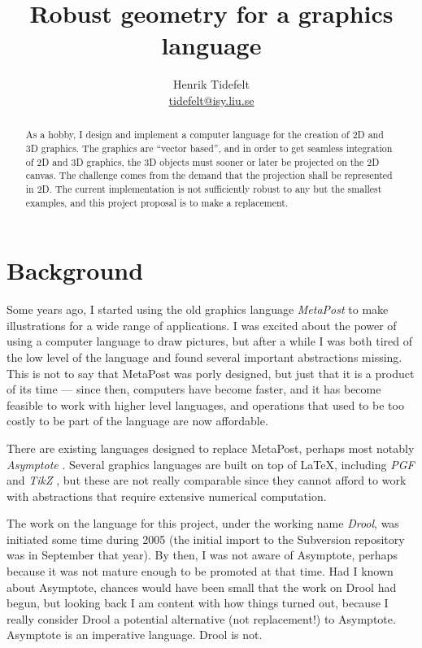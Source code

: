 \documentclass[a4paper]{article}
\title{Robust geometry for a graphics language}
\author{Henrik Tidefelt\\
\href{mailto:tidefelt@isy.liu.se}{\url{tidefelt@isy.liu.se}}}
\begin{document}
\maketitle

\begin{abstract}
  As a hobby, I design and implement a computer language for the creation of 2D and 3D graphics.  The graphics are ``vector based'', and in order to get seamless integration of 2D and 3D graphics, the 3D objects must sooner or later be projected on the 2D canvas.  The challenge comes from the demand that the projection shall be represented in 2D.  The current implementation is not sufficiently robust to any but the smallest examples, and this project proposal is to make a replacement.
\end{abstract}

\section*{Background}%
%
Some years ago, I started using the old graphics language \emph{MetaPost} \citep{Hobby94MetaPost} to make illustrations for a wide range of applications.  I was excited about the power of using a computer language to draw pictures, but after a while I was both tired of the low level of the language and found several important abstractions missing.  This is not to say that MetaPost was porly designed, but just that it is a product of its time --- since then, computers have become faster, and it has become feasible to work with higher level languages, and operations that used to be too costly to be part of the language are now affordable.

There are existing languages designed to replace MetaPost, perhaps most notably \emph{Asymptote} \citep{Asymptote_1.29}.  Several graphics languages are built on top of \LaTeX{}, including \emph{PGF} and \emph{TikZ} \citep{TikZ_PGF_1.00}, but these are not really comparable since they cannot afford to work with abstractions that require extensive numerical computation.

The work on the language for this project, under the working name \emph{Drool}, was initiated some time during 2005 (the initial import to the Subversion repository was in September that year).  By then, I was not aware of Asymptote, perhaps because it was not mature enough to be promoted at that time.  Had I known about Asymptote, chances would have been small that the work on Drool had begun, but looking back I am content with how things turned out, because I really consider Drool a potential alternative (not replacement!) to Asymptote.  Asymptote is an imperative language.  Drool is not.
\end{document}
